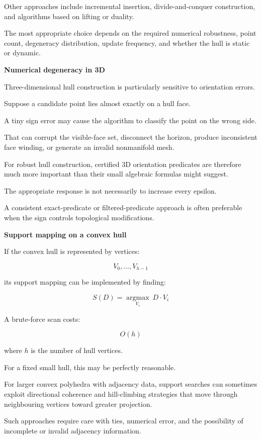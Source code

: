 Other approaches include incremental insertion, divide-and-conquer construction, and algorithms based on lifting or duality.

The most appropriate choice depends on the required numerical robustness, point count, degeneracy distribution, update frequency, and whether the hull is static or dynamic.

\textbf{Numerical degeneracy in 3D}

Three-dimensional hull construction is particularly sensitive to orientation errors.

Suppose a candidate point lies almost exactly on a hull face.

A tiny sign error may cause the algorithm to classify the point on the wrong side.

That can corrupt the visible-face set, disconnect the horizon, produce inconsistent face winding, or generate an invalid nonmanifold mesh.

For robust hull construction, certified 3D orientation predicates are therefore much more important than their small algebraic formulas might suggest.

The appropriate response is not necessarily to increase every epsilon.

A consistent exact-predicate or filtered-predicate approach is often preferable when the sign controls topological modifications.

\textbf{Support mapping on a convex hull}

If the convex hull is represented by vertices:

\[
V_0,\ldots,V_{h-1}
\]

its support mapping can be implemented by finding:

\[
\boxed{ S(D)=\underset{V_i}{\operatorname{argmax}}\ D\cdot V_i }
\]

A brute-force scan costs:

\[
O(h)
\]

where \(h\) is the number of hull vertices.

For a fixed small hull, this may be perfectly reasonable.

For larger convex polyhedra with adjacency data, support searches can sometimes exploit directional coherence and hill-climbing strategies that move through neighbouring vertices toward greater projection.

Such approaches require care with ties, numerical error, and the possibility of incomplete or invalid adjacency information.

